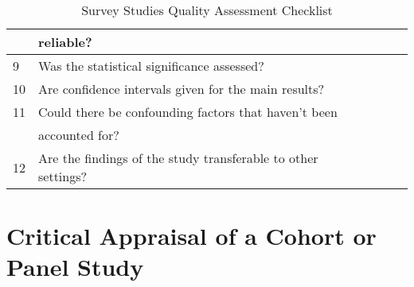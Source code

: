 \begin{table}[H]
\begin{center}
{\begin{tabular}{|l||l|l|l|l|}
                           & reliable?                                                        &&& \\
                        \hline
                        9  & Was the statistical significance assessed?                       &&& \\
                        \hline
                        10 & Are confidence intervals given for the main results?             &&& \\
                        \hline
                        11 & Could there be confounding factors that haven’t been             &&& \\
                           & accounted for?                                                   &&& \\
                        \hline
                        12 & Are the findings of the study transferable to other settings?    &&& \\
                        \hline
                \end{tabular}}
        \end{center}
        \caption{Survey Studies Quality Assessment Checklist}
        \label{table:surveyStudy}
\end{table}
    

\section{Critical Appraisal of a Cohort or Panel Study}


